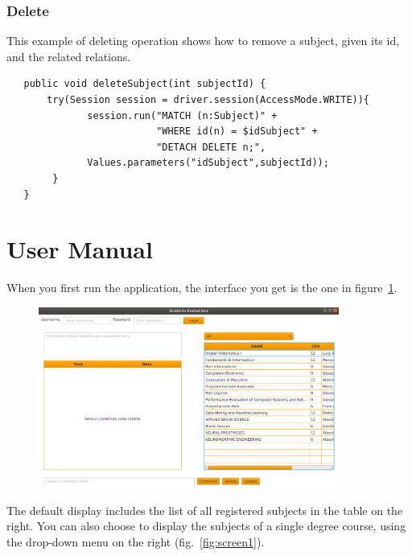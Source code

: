 \documentclass[a4paper]{article}
\begin{document}
\subsubsection{Delete}
This example of deleting operation shows how to remove a subject, given its id, and the related relations.

\begin{verbatim}
   public void deleteSubject(int subjectId) {
       try(Session session = driver.session(AccessMode.WRITE)){
              session.run("MATCH (n:Subject)" +
                          "WHERE id(n) = $idSubject" +
                          "DETACH DELETE n;",
              Values.parameters("idSubject",subjectId));
        }
   }
\end{verbatim}
\clearpage
\section{User Manual}
When you first run the application, the interface you get is the one in figure~\ref{fig:screen0}. 

\begin{figure}[h]
\centering
\includegraphics[width=0.88\textwidth]{images/screens/screen0}
\label{fig:screen0}
\end{figure}

The default display includes the list of all registered subjects in the table on the right. You can also choose to display the subjects of a single degree course, using the drop-down menu on the right (fig.~\ref{fig:screen1}).
\end{document}
